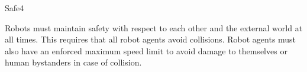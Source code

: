 \begin{nonfunctional_requirement}{Safe}{4}
\label{nfr:safe}
\item Robots must maintain safety with respect to each other and the external world at all times. This requires that all robot agents avoid collisions. Robot agents must also have an enforced maximum speed limit to avoid damage to themselves or human bystanders in case of collision. 
\end{nonfunctional_requirement}

\begin{comment}
\end{comment}
